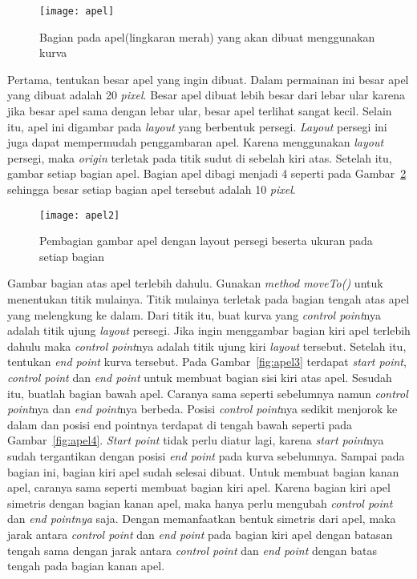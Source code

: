 \begin{figure}[H]
	\centering  
	\texttt{[image: apel]}  
	\caption[Bagian pada apel(lingkaran merah) yang akan dibuat menggunakan kurva]{Bagian pada apel(lingkaran merah) yang akan dibuat menggunakan kurva}
	\label{fig:apel} 
\end{figure}

Pertama, tentukan besar apel yang ingin dibuat. Dalam permainan ini besar apel yang dibuat adalah 20 \textit{pixel}. Besar apel dibuat lebih besar dari lebar ular karena jika besar apel sama dengan lebar ular, besar apel terlihat sangat kecil. Selain itu, apel ini digambar pada \textit{layout} yang berbentuk persegi. \textit{Layout} persegi ini juga dapat mempermudah penggambaran apel. Karena menggunakan \textit{layout} persegi, maka \textit{origin} terletak pada titik sudut di sebelah kiri atas. Setelah itu, gambar setiap bagian apel. Bagian apel dibagi menjadi 4 seperti pada Gambar~\ref{fig:apel2} sehingga besar setiap bagian apel tersebut adalah 10 \textit{pixel}. 

\begin{figure}[H]
	\centering  
	\texttt{[image: apel2]}  
	\caption[Pembagian gambar apel dengan layout persegi beserta ukuran pada setiap bagian]{Pembagian gambar apel dengan layout persegi beserta ukuran pada setiap bagian}
	\label{fig:apel2} 
\end{figure}

Gambar bagian atas apel terlebih dahulu. Gunakan \textit{method moveTo()} untuk menentukan titik mulainya. Titik mulainya terletak pada bagian tengah atas apel yang melengkung ke dalam. Dari titik itu, buat kurva yang \textit{control point}nya adalah titik ujung \textit{layout} persegi. Jika ingin menggambar bagian kiri apel terlebih dahulu maka \textit{control point}nya adalah titik ujung kiri \textit{layout} tersebut. Setelah itu, tentukan \textit{end point} kurva tersebut. Pada Gambar~\ref{fig:apel3} terdapat \textit{start point}, \textit{control point} dan \textit{end point} untuk membuat bagian sisi kiri atas apel. Sesudah itu, buatlah bagian bawah apel. Caranya sama seperti sebelumnya namun \textit{control point}nya dan \textit{end point}nya berbeda. Posisi \textit{control point}nya sedikit menjorok ke dalam dan posisi end pointnya terdapat di tengah bawah seperti pada Gambar~\ref{fig:apel4}. \textit{Start point} tidak perlu diatur lagi, karena \textit{start point}nya sudah tergantikan dengan posisi \textit{end point} pada kurva sebelumnya. Sampai pada bagian ini, bagian kiri apel sudah selesai dibuat. Untuk membuat bagian kanan apel, caranya sama seperti membuat bagian kiri apel. Karena bagian kiri apel simetris dengan bagian kanan apel, maka hanya perlu mengubah \textit{control point} dan \textit{end pointnya} saja. Dengan memanfaatkan bentuk simetris dari apel, maka jarak antara \textit{control point} dan \textit{end point} pada bagian kiri apel dengan batasan tengah sama dengan jarak antara \textit{control point} dan \textit{end point} dengan batas tengah pada bagian kanan apel. 

